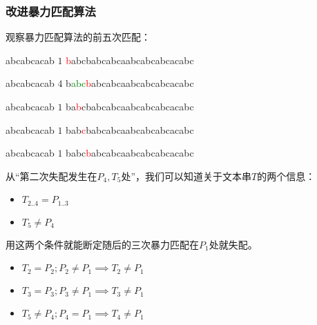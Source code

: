 \documentclass{ctexbeamer}
\newcommand{\red}[1]{\textcolor{red}{#1}}
\newcommand{\green}[1]{\textcolor{green}{#1}}
\begin{document}
\begin{frame}[fragile]
\frametitle{改进暴力匹配算法}

观察暴力匹配算法的前五次匹配：

	\begin{tverb}[frame=bottomline, fontsize=\small]
abcabcacab \(1\)
\red{b}abcbabcabcaabcabcabcacabc
	\end{tverb}

\begin{tverb}[frame=bottomline, fontsize=\small]
 abcabcacab \(4\)
b\green{abc}\red{b}abcabcaabcabcabcacabc
	\end{tverb}


	\begin{tverb}[frame=bottomline, fontsize=\small]
  abcabcacab \(1\)
ba\red{b}cbabcabcaabcabcabcacabc
	\end{tverb}

	\begin{tverb}[frame=bottomline, fontsize=\small]
   abcabcacab \(1\)
bab\red{c}babcabcaabcabcabcacabc
	\end{tverb}

	\begin{tverb}[frame=bottomline, fontsize=\small]
    abcabcacab \(1\)
babc\red{b}abcabcaabcabcabcacabc
	\end{tverb}

从``第二次失配发生在$P_4, T_5$处''，我们可以知道关于文本串$T$的两个信息：
\begin{itemize}
\item $T_{2..4} = P_{1..3}$
\item $T_5 \ne P_4$
\end{itemize}
用这两个条件就能断定随后的三次暴力匹配在$P_1$处就失配。 
\begin{itemize}
  \item $T_2 = P_2; P_2 \ne P_1 \implies T_2 \ne P_1$
  \item $T_3 = P_3; P_3 \ne P_1 \implies T_3 \ne P_1$
  \item $T_5 \ne P_4; P_4 = P_1 \implies T_4 \ne P_1$
\end{itemize}

\end{frame}
\end{document}
